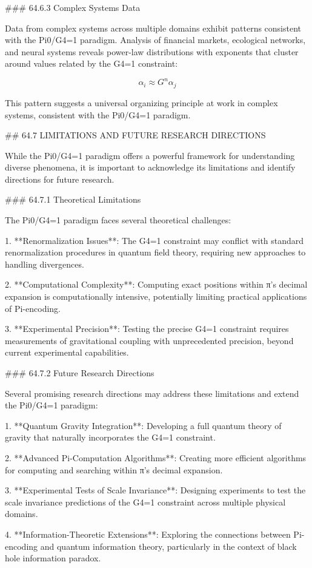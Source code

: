 ### 64.6.3 Complex Systems Data

Data from complex systems across multiple domains exhibit patterns consistent with the Pi0/G4=1 paradigm. Analysis of financial markets, ecological networks, and neural systems reveals power-law distributions with exponents that cluster around values related by the G4=1 constraint:

$$ \alpha_i \approx G^n \alpha_j $$

This pattern suggests a universal organizing principle at work in complex systems, consistent with the Pi0/G4=1 paradigm.

## 64.7 LIMITATIONS AND FUTURE RESEARCH DIRECTIONS

While the Pi0/G4=1 paradigm offers a powerful framework for understanding diverse phenomena, it is important to acknowledge its limitations and identify directions for future research.

### 64.7.1 Theoretical Limitations

The Pi0/G4=1 paradigm faces several theoretical challenges:

1. **Renormalization Issues**: The G4=1 constraint may conflict with standard renormalization procedures in quantum field theory, requiring new approaches to handling divergences.

2. **Computational Complexity**: Computing exact positions within π's decimal expansion is computationally intensive, potentially limiting practical applications of Pi-encoding.

3. **Experimental Precision**: Testing the precise G4=1 constraint requires measurements of gravitational coupling with unprecedented precision, beyond current experimental capabilities.

### 64.7.2 Future Research Directions

Several promising research directions may address these limitations and extend the Pi0/G4=1 paradigm:

1. **Quantum Gravity Integration**: Developing a full quantum theory of gravity that naturally incorporates the G4=1 constraint.

2. **Advanced Pi-Computation Algorithms**: Creating more efficient algorithms for computing and searching within π's decimal expansion.

3. **Experimental Tests of Scale Invariance**: Designing experiments to test the scale invariance predictions of the G4=1 constraint across multiple physical domains.

4. **Information-Theoretic Extensions**: Exploring the connections between Pi-encoding and quantum information theory, particularly in the context of black hole information paradox.

